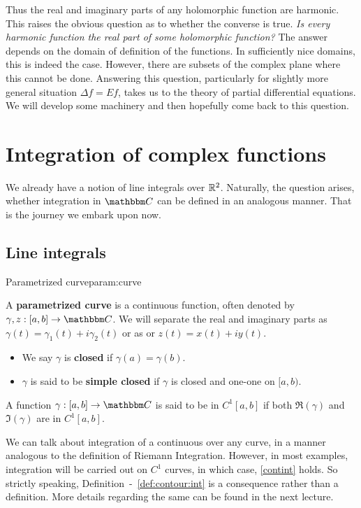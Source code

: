 \documentclass[../ComplexAnalysis_Notes.tex]{subfiles}
\begin{document}
Thus the real and imaginary parts of any holomorphic function are harmonic. This raises the obvious question as to whether the converse is true. \textit{Is every harmonic function the real part of some holomorphic function?} The answer depends on the domain of definition of the functions. In sufficiently nice domains, this is indeed the case. However, there are subsets of the complex plane where this cannot be done. Answering this question, particularly for slightly more general situation \(\Delta f = Ef\), takes us to the theory of partial differential equations. We will develop some machinery and then hopefully come back to this question.

\section{Integration of complex functions}
We already have a notion of line integrals over \(\mathbb{R}^2\). Naturally, the question arises, whether integration in \(\C\) can be defined in an analogous manner. That is the journey we embark upon now.

\subsection*{Line integrals}

\begin{Def}{Parametrized curve}{param:curve}
  
    A \textbf{parametrized curve} is a continuous function, often denoted by \(\gamma, z : [a, b] \to \C\). We will separate the real and imaginary parts as \(\gamma(t) = \gamma_1(t) + i \gamma_2(t)\) or as \(\text{or } z(t) = x(t) + iy(t) \).
    \begin{itemize}
    \item We say \(\gamma\) is \textbf{closed} if \(\gamma(a) = \gamma(b)\).
    \item \(\gamma\) is said to be \textbf{simple closed} if \(\gamma\) is closed and one-one on $[a,b)$.
  \end{itemize}
\end{Def}

\begin{Def}{}{}
  A function \(\gamma : [a, b] \to \C\) is said to be in \(C^1[a, b]\) if both \(\Re(\gamma)\) and \(\Im(\gamma)\) are in \(C^1[a, b]\).
\end{Def}

We can talk about integration of a continuous over any curve, in a manner analogous to the definition of Riemann Integration. However, in most examples, integration will be carried out on $C^1$ curves, in which case, \eqref{contint} holds. So strictly speaking, Definition~-~\ref{def:contour:int} is a consequence rather than a definition. More details regarding the same can be found in the next lecture.
\end{document}

